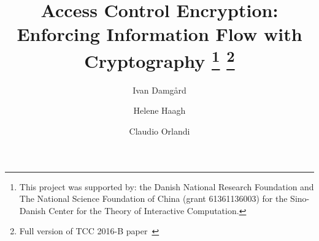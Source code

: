 \documentclass{llncs}
\title{Access Control Encryption: \\ Enforcing Information Flow with Cryptography
\thanks{This project was supported by: the Danish National Research Foundation and The National Science Foundation of China (grant 61361136003) for the Sino-Danish Center for the Theory of Interactive Computation.}
\thanks{Full version of TCC 2016-B paper~\cite{ACE-TCC2016B}}}
\author{Ivan Damg{\aa}rd \and Helene Haagh \and Claudio Orlandi}
\institute{\{ivan,haagh,orlandi\}@cs.au.dk, Aarhus University}
\begin{document}
\maketitle
\newcommand{\todo}[1]{\textcolor{red}{(TODO: #1)}}
\newcommand{\hfh}[1]{\textcolor{green}{(Helene: #1)}}
\newcommand{\cnote}[1]{\textcolor{blue}{(Claudio: #1)}}

\newcommand{\from}{\leftarrow}
\newcommand{\zo}{\{0,1\}}
\newcommand{\zon}{\{0,1\}^n}
\newcommand{\zok}{\{0,1\}^\kappa}

\newcommand{\RR}{\mathbb{R}}
\newcommand{\NN}{\mathbb{N}}
\newcommand{\San}{\mathsf{San}}
\newcommand{\negl}{\mathsf{negl}}

\newtheorem{construction}{Construction}



\newcommand{\Setup}{\mathsf{Setup}}
\newcommand{\Gen}{\mathsf{Gen}}
\newcommand{\Enc}{\mathsf{Enc}}
\newcommand{\Dec}{\mathsf{Dec}}
\newcommand{\randDec}{\mathsf{RDec}}
\newcommand{\Prove}{\mathsf{Prove}}
\newcommand{\Verify}{\mathsf{Verify}}
\newcommand{\M}{\mathcal{M}}
\newcommand{\sen}{\mathsf{sen}}
\newcommand{\rec}{\mathsf{rec}}
\newcommand{\san}{\mathsf{san}}
\newcommand{\C}{\mathcal{C}}
\newcommand{\Sim}{\mathsf{Sim}}

\newcommand{\Rand}{\San}
\newcommand{\PKE}{\mathsf{PKE}}
\newcommand{\secparam}{\kappa}
\newcommand{\ACE}{\mathsf{ACE}}

\newcommand{\desc}{\textup{desc}}

\newcommand{\oACE}{-ACE\xspace}

\newcommand{\oneACE}{\mathsf{1ACE}}
\newcommand{\oneACEpow}{\mathsf{1ACE}}
\newcommand{\EGACE}{\mathsf{EGACE}}

\newcommand{\CCG}{\mathsf{Challenge}}


\newcommand{\sanFE}{\mathsf{sFE}}
\newcommand{\sanFEpow}{\mathsf{sFE}}
\newcommand{\sanPKE}{\mathsf{sPKE}}
\newcommand{\NIZK}{\mathsf{NIZK}}
\newcommand{\PRF}{\mathsf{PRF}}

\newcommand{\R}{\mathcal{R}}
\newcommand{\MasterDec}{\mathsf{MDec}}
\newcommand{\adv}[1]{\mathsf{adv}^{#1}} 

\newcommand{\sssprob}{p_{sss}}

\renewenvironment{claim}{
	\refstepcounter{claimcounter}
	\medskip
	\noindent \textit{Claim~\arabic{claimcounter}}. \enskip
}{

}
\end{document}
